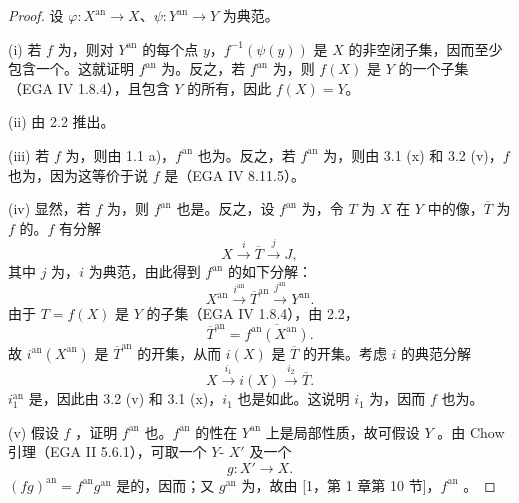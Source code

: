 \begin{proof}
设 $\varphi:X^{\mathrm{an}}\to X$、$\psi:Y^{\mathrm{an}}\to Y$ 为典范。

(i) 若 $f$ 为，则对 $Y^{\mathrm{an}}$ 的每个点 $y$，$f^{-1}(\psi(y))$ 是 $X$ 的非空闭子集，因而至少包含一个。这就证明 $f^{\mathrm{an}}$ 为。反之，若 $f^{\mathrm{an}}$ 为，则 $f(X)$ 是 $Y$ 的一个子集（EGA IV 1.8.4），且包含 $Y$ 的所有，因此 $f(X)=Y$。

(ii) 由 2.2 推出。

(iii) 若 $f$ 为，则由 1.1 a)，$f^{\mathrm{an}}$ 也为。反之，若 $f^{\mathrm{an}}$ 为，则由 3.1 (x) 和 3.2 (v)，$f$ 也为，因为这等价于说 $f$ 是（EGA IV 8.11.5）。

(iv) 显然，若 $f$ 为，则 $f^{\mathrm{an}}$ 也是。反之，设 $f^{\mathrm{an}}$ 为，令 $T$ 为 $X$ 在 $Y$ 中的像，$\overline T$ 为 $f$ 的。$f$ 有分解
\[
X\xrightarrow{i}\overline T\xrightarrow{j}J,
\]
其中 $j$ 为，$i$ 为典范，由此得到 $f^{\mathrm{an}}$ 的如下分解：
\[
X^{\mathrm{an}}\xrightarrow{i^{\mathrm{an}}}\overline T^{\mathrm{an}}\xrightarrow{j^{\mathrm{an}}}Y^{\mathrm{an}}.
\]
由于 $T=f(X)$ 是 $Y$ 的子集（EGA IV 1.8.4），由 2.2，
\[
\overline T^{\mathrm{an}}=\overline{f^{\mathrm{an}}(X^{\mathrm{an}})}.
\]
故 $i^{\mathrm{an}}(X^{\mathrm{an}})$ 是 $\overline T^{\mathrm{an}}$ 的开集，从而 $i(X)$ 是 $\overline T$ 的开集。考虑 $i$ 的典范分解
\[
X\xrightarrow{i_1}i(X)\xrightarrow{i_2}\overline T.
\]
 $i_1^{\mathrm{an}}$ 是，因此由 3.2 (v) 和 3.1 (x)，$i_1$ 也是如此。这说明 $i_1$ 为，因而 $f$ 也为。

(v) 假设 $f$ ，证明 $f^{\mathrm{an}}$ 也。$f^{\mathrm{an}}$ 的性在 $Y^{\mathrm{an}}$ 上是局部性质，故可假设 $Y$ 。由 Chow 引理（EGA II 5.6.1），可取一个 $Y$- $X'$ 及一个
\[
g:X'\longrightarrow X.
\]
 $(fg)^{\mathrm{an}}=f^{\mathrm{an}}g^{\mathrm{an}}$ 是的，因而；又 $g^{\mathrm{an}}$ 为，故由 [1，第 1 章第 10 节]，$f^{\mathrm{an}}$ 。


\end{proof}
